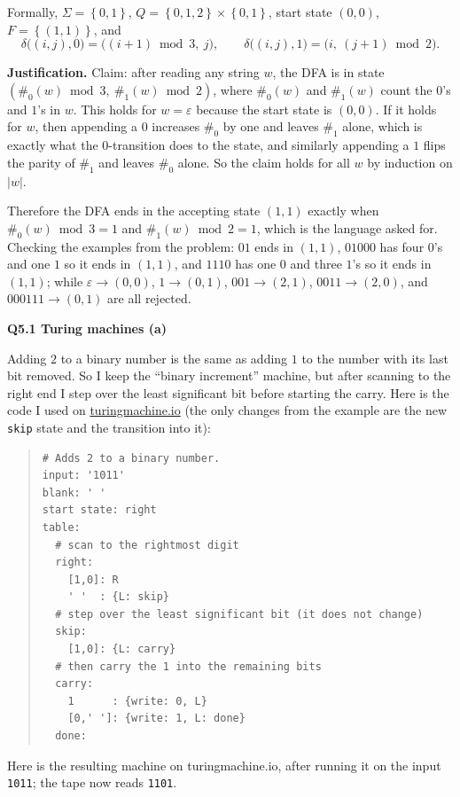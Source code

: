\documentclass[11pt]{article}
\newcommand{\set}[1]{\left\{#1\right\}}
\newcommand{\abs}[1]{\left|#1\right|}
\newcommand{\qpage}[1]{\clearpage\noindent\textbf{\large #1}\par\medskip}
\begin{document}
Formally, $\Sigma = \set{0,1}$, $Q = \set{0,1,2} \times \set{0,1}$, start state $(0,0)$, $F = \set{(1,1)}$, and
\[
  \delta\big((i,j), 0\big) = \big((i+1) \bmod 3,\ j\big), \qquad
  \delta\big((i,j), 1\big) = \big(i,\ (j+1) \bmod 2\big).
\]

\textbf{Justification.}
Claim: after reading any string $w$, the DFA is in state $(\#_0(w) \bmod 3,\ \#_1(w) \bmod 2)$, where $\#_0(w)$ and $\#_1(w)$ count the $0$'s and $1$'s in $w$.
This holds for $w = \varepsilon$ because the start state is $(0,0)$.
If it holds for $w$, then appending a $0$ increases $\#_0$ by one and leaves $\#_1$ alone, which is exactly what the $0$-transition does to the state, and similarly appending a $1$ flips the parity of $\#_1$ and leaves $\#_0$ alone.
So the claim holds for all $w$ by induction on $\abs{w}$.

Therefore the DFA ends in the accepting state $(1,1)$ exactly when $\#_0(w) \bmod 3 = 1$ and $\#_1(w) \bmod 2 = 1$, which is the language asked for.
Checking the examples from the problem: $01$ ends in $(1,1)$, $01000$ has four $0$'s and one $1$ so it ends in $(1,1)$, and $1110$ has one $0$ and three $1$'s so it ends in $(1,1)$; while $\varepsilon \to (0,0)$, $1 \to (0,1)$, $001 \to (2,1)$, $0011 \to (2,0)$, and $000111 \to (0,1)$ are all rejected.

\qpage{Q5.1 Turing machines (a)}

Adding $2$ to a binary number is the same as adding $1$ to the number with its last bit removed.
So I keep the ``binary increment'' machine, but after scanning to the right end I step over the least significant bit before starting the carry.
Here is the code I used on \href{https://turingmachine.io/}{turingmachine.io} (the only changes from the example are the new \texttt{skip} state and the transition into it):

\begin{quote}\small
\begin{verbatim}
# Adds 2 to a binary number.
input: '1011'
blank: ' '
start state: right
table:
  # scan to the rightmost digit
  right:
    [1,0]: R
    ' '  : {L: skip}
  # step over the least significant bit (it does not change)
  skip:
    [1,0]: {L: carry}
  # then carry the 1 into the remaining bits
  carry:
    1      : {write: 0, L}
    [0,' ']: {write: 1, L: done}
  done:
\end{verbatim}
\end{quote}

Here is the resulting machine on turingmachine.io, after running it on the input \texttt{1011}; the tape now reads \texttt{1101}.
\end{document}
